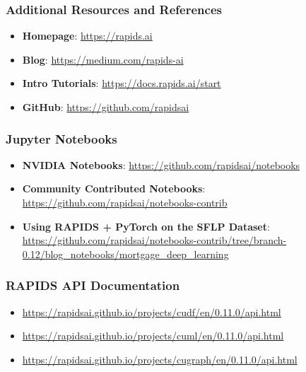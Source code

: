 \documentclass{beamer}
\begin{document}
\begin{frame}
   \frametitle{Additional Resources and References}
   \begin{itemize}\setlength\itemsep{1.5em}
      \item \textbf{Homepage}: \url{https://rapids.ai}
      \item \textbf{Blog}: \url{https://medium.com/rapids-ai}
      \item \textbf{Intro Tutorials}: \url{https://docs.rapids.ai/start}
      \item \textbf{GitHub}: \url{https://github.com/rapidsai}
   \end{itemize}
\end{frame}

\begin{frame}
   \frametitle{Jupyter Notebooks}
   \begin{itemize}\setlength\itemsep{1.5em}
      \item \textbf{NVIDIA Notebooks}: \url{https://github.com/rapidsai/notebooks}
      \item \textbf{Community Contributed Notebooks}: \url{https://github.com/rapidsai/notebooks-contrib}
      \item \textbf{Using RAPIDS + PyTorch on the SFLP Dataset}: \url{https://github.com/rapidsai/notebooks-contrib/tree/branch-0.12/blog_notebooks/mortgage_deep_learning}
   \end{itemize}
\end{frame}

\begin{frame}
   \frametitle{RAPIDS API Documentation}
   \begin{itemize}\setlength\itemsep{1.5em}
      \item \url{https://rapidsai.github.io/projects/cudf/en/0.11.0/api.html}
      \item \url{https://rapidsai.github.io/projects/cuml/en/0.11.0/api.html}
      \item \url{https://rapidsai.github.io/projects/cugraph/en/0.11.0/api.html}
   \end{itemize}
\end{frame}
\end{document}
